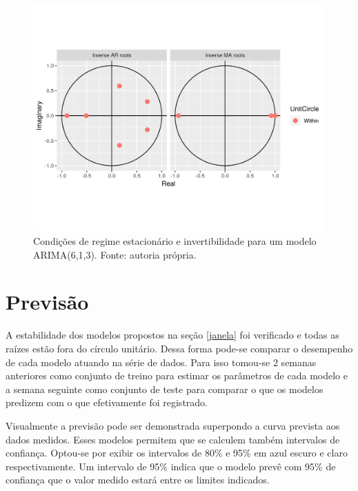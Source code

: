 \documentclass[
	12pt,				%
	openright,			%
	oneside,			%
	a4paper,			%
	english,			%
	french,				%
	spanish,			%
	brazil				%
	]{abntex2}
\begin{document}
\begin{figure}[h]
    \centering
	\includegraphics[width=\textwidth]{conds}
	\caption{Condições de regime estacionário e invertibilidade para um modelo ARIMA(6,1,3). Fonte: autoria própria.}
\end{figure}
\FloatBarrier

\section{Previsão}

A estabilidade dos modelos propostos na seção \ref{janela} foi verificado e todas as raízes estão fora do círculo unitário. Dessa forma pode-se comparar o desempenho de cada modelo atuando na série de dados. Para isso tomou-se 2 semanas anteriores como conjunto de treino para estimar os parâmetros de cada modelo e a semana seguinte como conjunto de teste para comparar o que os modelos predizem com o que efetivamente foi registrado.

Visualmente a previsão pode ser demonstrada superpondo a curva prevista aos dados medidos. Esses modelos permitem que se calculem também intervalos de confiança. Optou-se por exibir os intervalos de 80\% e 95\% em azul escuro e claro respectivamente. Um intervalo de 95\% indica que o modelo prevê com 95\% de confiança que o valor medido estará entre os limites indicados.
\end{document}
